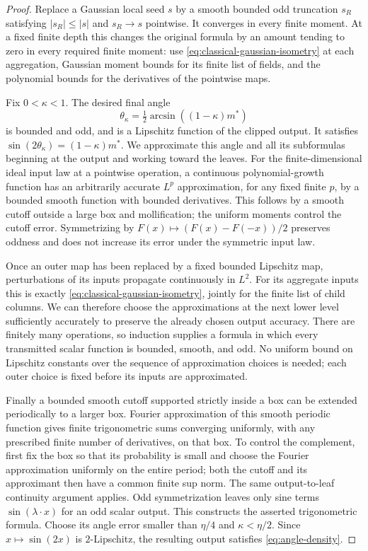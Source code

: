 \begin{proof}
Replace a Gaussian local seed $s$ by a smooth bounded odd truncation
$s_R$ satisfying $|s_R|\le|s|$ and $s_R\to s$ pointwise.  It converges
in every finite moment.  At a fixed finite depth this changes the
original formula by an amount tending to zero in every required
finite moment: use \eqref{eq:classical-gaussian-isometry} at each
aggregation, Gaussian moment bounds for its finite list of fields,
and the polynomial bounds for the derivatives of the pointwise maps.

Fix $0<\kappa<1$.  The desired final angle
\[
 \theta_\kappa=\tfrac12\arcsin((1-\kappa)m^*)
\]
is bounded and odd, and is a Lipschitz function of the clipped output.
It satisfies $\sin(2\theta_\kappa)=(1-\kappa)m^*$.
We approximate this angle and all its subformulas beginning at the
output and working toward the leaves.  For the finite-dimensional
ideal input law at a pointwise operation, a continuous polynomial-growth
function has an arbitrarily accurate $L^p$ approximation, for any
fixed finite $p$, by a bounded smooth function with bounded
derivatives.  This follows by a smooth cutoff outside a large box
and mollification; the uniform moments control the cutoff error.
Symmetrizing by $F(x)\mapsto(F(x)-F(-x))/2$ preserves oddness and
does not increase its error under the symmetric input law.

Once an outer map has been replaced by a fixed bounded Lipschitz
map, perturbations of its inputs propagate continuously in $L^2$.
For its aggregate inputs this is exactly
\eqref{eq:classical-gaussian-isometry}, jointly for the finite list
of child columns.  We can therefore choose the approximations at
the next lower level sufficiently accurately to preserve the
already chosen output accuracy.  There are finitely many operations,
so induction supplies a formula in which every transmitted scalar
function is bounded, smooth, and odd.  No uniform bound on Lipschitz
constants over the sequence of approximation choices is needed;
each outer choice is fixed before its inputs are approximated.

Finally a bounded smooth cutoff supported strictly inside a box can
be extended periodically to a larger box.  Fourier approximation of
this smooth periodic function gives finite trigonometric sums
converging uniformly, with any prescribed finite number of
derivatives, on that box.  To control the complement, first fix the
box so that its probability is small and choose the Fourier
approximation uniformly on the entire period; both the cutoff and
its approximant then have a common finite sup norm.  The same
output-to-leaf continuity argument applies.  Odd symmetrization
leaves only sine terms $\sin(\lambda\cdot x)$ for an odd scalar
output.  This constructs the asserted trigonometric formula.
Choose its angle error smaller than $\eta/4$ and $\kappa<\eta/2$.
Since $x\mapsto\sin(2x)$ is $2$-Lipschitz, the resulting output
satisfies \eqref{eq:angle-density}.
\end{proof}


